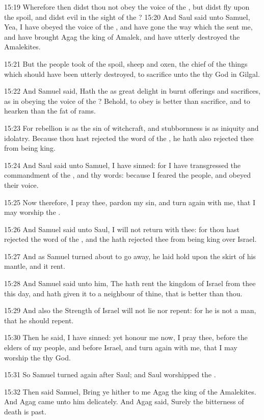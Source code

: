 15:19 Wherefore then didst thou not obey the voice of the \LORD, but didst fly upon the spoil, and didst evil in the sight of the \LORD?  15:20 And Saul said unto Samuel, Yea, I have obeyed the voice of the \LORD, and have gone the way which the \LORD sent me, and have brought Agag the king of Amalek, and have utterly destroyed the Amalekites.

15:21 But the people took of the spoil, sheep and oxen, the chief of the things which should have been utterly destroyed, to sacrifice unto the \LORD thy God in Gilgal.

15:22 And Samuel said, Hath the \LORD as great delight in burnt offerings and sacrifices, as in obeying the voice of the \LORD? Behold, to obey is better than sacrifice, and to hearken than the fat of rams.

15:23 For rebellion is as the sin of witchcraft, and stubbornness is as iniquity and idolatry. Because thou hast rejected the word of the \LORD, he hath also rejected thee from being king.

15:24 And Saul said unto Samuel, I have sinned: for I have transgressed the commandment of the \LORD, and thy words: because I feared the people, and obeyed their voice.

15:25 Now therefore, I pray thee, pardon my sin, and turn again with me, that I may worship the \LORD.

15:26 And Samuel said unto Saul, I will not return with thee: for thou hast rejected the word of the \LORD, and the \LORD hath rejected thee from being king over Israel.

15:27 And as Samuel turned about to go away, he laid hold upon the skirt of his mantle, and it rent.

15:28 And Samuel said unto him, The \LORD hath rent the kingdom of Israel from thee this day, and hath given it to a neighbour of thine, that is better than thou.

15:29 And also the Strength of Israel will not lie nor repent: for he is not a man, that he should repent.

15:30 Then he said, I have sinned: yet honour me now, I pray thee, before the elders of my people, and before Israel, and turn again with me, that I may worship the \LORD thy God.

15:31 So Samuel turned again after Saul; and Saul worshipped the \LORD.

15:32 Then said Samuel, Bring ye hither to me Agag the king of the Amalekites. And Agag came unto him delicately. And Agag said, Surely the bitterness of death is past.

